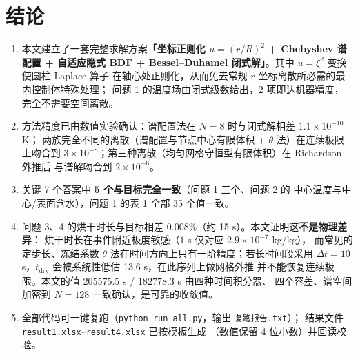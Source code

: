 \documentclass[11pt,a4paper]{article}
\theoremstyle{definition}
\begin{document}
\section{结论}

\begin{enumerate}[leftmargin=1.9em]
\item 本文建立了一套完整求解方案\textbf{「坐标正则化 $u=(r/R)^2$ + Chebyshev 谱配置 +
自适应隐式 BDF + Bessel--Duhamel 闭式解」}。其中 $u=\xi^2$ 变换使圆柱 Laplace 算子
在轴心处正则化，从而免去常规 $r$ 坐标离散所必需的最内控制体特殊处理；
问题 1 的温度场由闭式级数给出，2 项即达机器精度，完全不需要空间离散。

\item 方法精度已由数值实验确认：谱配置法在 $N=8$ 时与闭式解相差 $1.1\times10^{-10}$ K；
两族完全不同的离散（谱配置与节点中心有限体积 + $\theta$ 法）在连续极限上吻合到
$3\times10^{-8}$；第三种离散（均匀网格守恒型有限体积）在 Richardson 外推后
与谱解吻合到 $2\times10^{-6}$。

\item 关键 7 个答案中 \textbf{5 个与目标完全一致}（问题 1 三个、问题 2 的
中心温度与中心/表面含水），问题 1 的表 1 全部 35 个值一致。

\item 问题 3、4 的烘干时长与目标相差 $0.008\%$（约 15 s）。本文证明这\textbf{不是物理差异}：
烘干时长在事件附近极度敏感（$1$ s 仅对应 $2.9\times10^{-7}$ kg/kg），
而常见的定步长、冻结系数 $\theta$ 法在时间方向上只有一阶精度；若长时间段采用
$\Delta t=10$ s，$t_{\text{dry}}$ 会被系统性低估 13.6 s，在此序列上做网格外推
并不能恢复连续极限。本文的值 $205575.5$ s / $182778.3$ s 由四种时间积分器、
四个容差、谱空间加密到 $N=128$ 一致确认，是可靠的收敛值。

\item 全部代码可一键复跑（\texttt{python run\_all.py}，输出 \texttt{复跑报告.txt}）；
结果文件 \texttt{result1.xlsx}--\texttt{result4.xlsx} 已按模板生成
（数值保留 4 位小数）并回读校验。
\end{enumerate}
\end{document}
